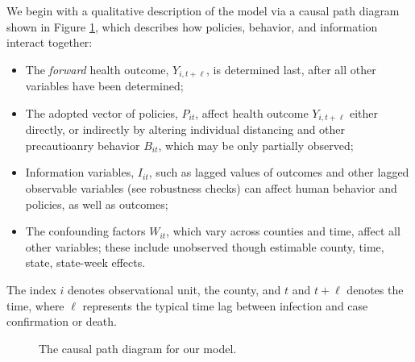 \documentclass[9pt,twoside,lineno]{pnas-new}
\theoremstyle{definition}
\begin{document}
We begin with a qualitative description of the model via a causal path diagram shown in Figure \ref{Wright}, which describes how policies, behavior, and information interact together:
\begin{itemize}
\item The \textit{forward} health outcome,
$Y_{i,t+\ell}$, is determined last, after all other variables have been determined;
\item The  adopted vector of policies, $P_{it}$,  affect health outcome $Y_{i,t+\ell}$ either directly, or indirectly by altering  individual distancing and other precautioanry behavior  $B_{it}$, which may be only partially observed;
\item  Information variables, $I_{it}$, such as lagged values of outcomes and other lagged observable variables (see robustness checks) can affect human behavior and  policies, as well as  outcomes;
\item The confounding factors $W_{it}$, which vary across counties and time, affect all other variables; these include
unobserved though estimable county, time, state, state-week effects.
\end{itemize}
The index $i$ denotes observational unit, the county, and $t$ and $t+\ell$ denotes the time, where  $\ell$ represents the typical time lag  between infection and case confirmation or death.
\begin{figure}[ht]
\begin{center}
 \end{center}
\caption{The causal path diagram for our model.}\label{Wright}
\end{figure}
\end{document}
